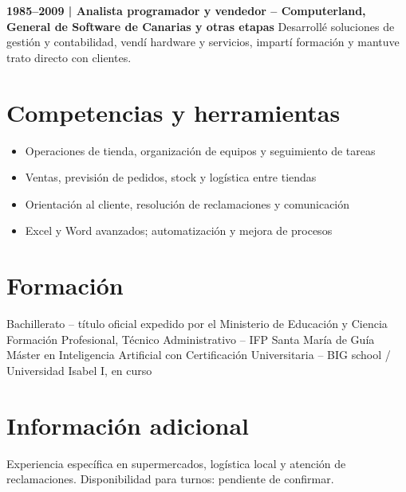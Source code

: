 \documentclass[11pt,a4paper]{article}
\begin{document}
\textbf{1985--2009 | Analista programador y vendedor -- Computerland, General de Software de Canarias y otras etapas} Desarrollé soluciones de gestión y contabilidad, vendí hardware y servicios, impartí formación y mantuve trato directo con clientes.
\section*{Competencias y herramientas}
\begin{itemize}[leftmargin=*]
\item Operaciones de tienda, organización de equipos y seguimiento de tareas
\item Ventas, previsión de pedidos, stock y logística entre tiendas
\item Orientación al cliente, resolución de reclamaciones y comunicación
\item Excel y Word avanzados; automatización y mejora de procesos
\end{itemize}
\section*{Formación}
Bachillerato -- título oficial expedido por el Ministerio de Educación y Ciencia\\
Formación Profesional, Técnico Administrativo -- IFP Santa María de Guía\\
Máster en Inteligencia Artificial con Certificación Universitaria -- BIG school / Universidad Isabel I, en curso
\section*{Información adicional}
Experiencia específica en supermercados, logística local y atención de reclamaciones. Disponibilidad para turnos: pendiente de confirmar.
\end{document}
